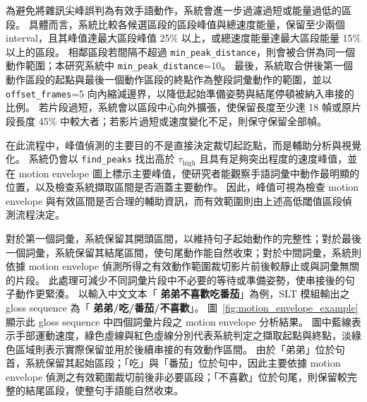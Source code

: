 \documentclass[class=NCU_thesis, crop=false]{standalone}
\begin{document}
為避免將雜訊尖峰誤判為有效手語動作，系統會進一步過濾過短或能量過低的區段。
具體而言，系統比較各候選區段的區段峰值與總速度能量，保留至少兩個 interval，且其峰值達最大區段峰值 25\% 以上，或總速度能量達最大區段能量 15\% 以上的區段。
相鄰區段若間隔不超過 \texttt{min\_peak\_distance}，則會被合併為同一個動作範圍；本研究系統中 \texttt{min\_peak\_distance}=10。
最後，系統取合併後第一個動作區段的起點與最後一個動作區段的終點作為整段詞彙動作的範圍，並以 \texttt{offset\_frames}=5 向內縮減邊界，以降低起始準備姿勢與結尾停頓被納入串接的比例。
若片段過短，系統會以區段中心向外擴張，使保留長度至少達 18 幀或原片段長度 45\% 中較大者；若影片過短或速度變化不足，則保守保留全部幀。

在此流程中，峰值偵測的主要目的不是直接決定裁切起訖點，而是輔助分析與視覺化。
系統仍會以 \texttt{find\_peaks} 找出高於 $\tau_{\mathrm{high}}$ 且具有足夠突出程度的速度峰值，並在 motion envelope 圖上標示主要峰值，使研究者能觀察手語詞彙中動作最明顯的位置，以及檢查系統擷取區間是否涵蓋主要動作。
因此，峰值可視為檢查 motion envelope 與有效區間是否合理的輔助資訊，而有效範圍則由上述高低閾值區段偵測流程決定。

對於第一個詞彙，系統保留其開頭區間，以維持句子起始動作的完整性；對於最後一個詞彙，系統保留其結尾區間，使句尾動作能自然收束；對於中間詞彙，系統則依據 motion envelope 偵測所得之有效動作範圍裁切影片前後較靜止或與詞彙無關的片段。
此處理可減少不同詞彙片段中不必要的等待或準備姿勢，使串接後的句子動作更緊湊。
以輸入中文文本「 \textbf{弟弟不喜歡吃番茄}」為例，SLT 模組輸出之 gloss sequence 為「 \textbf{弟弟/吃/番茄/不喜歡}」。
圖~\ref{fig:motion_envelope_example} 顯示此 gloss sequence 中四個詞彙片段之 motion envelope 分析結果。
圖中藍線表示手部運動速度，綠色虛線與紅色虛線分別代表系統判定之擷取起點與終點，淡綠色區域則表示實際保留並用於後續串接的有效動作區間。
由於「弟弟」位於句首，系統保留其起始區段；「吃」與「番茄」位於句中，因此主要依據 motion envelope 偵測之有效範圍裁切前後非必要區段；「不喜歡」位於句尾，則保留較完整的結尾區段，使整句手語能自然收束。
\end{document}
